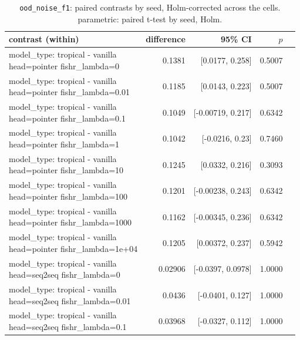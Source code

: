 \documentclass[10pt]{article}
\makeatletter
\newcommand{\stackcell}[1]{\begin{tabular}[t]{@{}l@{}}#1\end{tabular}}
\makeatother
\begin{document}
{\small
\begin{longtable}{lrrrl}
\caption{\texttt{ood\_noise\_f1}: paired contrasts by seed, Holm-corrected across the cells. parametric: paired t-test by seed, Holm.}\label{tab:paired-ood_noise_f1}\\
\toprule
contrast (within) & difference & 95\% CI & $p$ & \\
\midrule
\endhead
\stackcell{model\_type: tropical - vanilla\\\footnotesize head=pointer fishr\_lambda=0 } & 0.1381 & [0.0177, 0.258] & 0.5007 & \\
\stackcell{model\_type: tropical - vanilla\\\footnotesize head=pointer fishr\_lambda=0.01 } & 0.1185 & [0.0143, 0.223] & 0.5007 & \\
\stackcell{model\_type: tropical - vanilla\\\footnotesize head=pointer fishr\_lambda=0.1 } & 0.1049 & [-0.00719, 0.217] & 0.6342 & \\
\stackcell{model\_type: tropical - vanilla\\\footnotesize head=pointer fishr\_lambda=1 } & 0.1042 & [-0.0216, 0.23] & 0.7460 & \\
\stackcell{model\_type: tropical - vanilla\\\footnotesize head=pointer fishr\_lambda=10 } & 0.1245 & [0.0332, 0.216] & 0.3093 & \\
\stackcell{model\_type: tropical - vanilla\\\footnotesize head=pointer fishr\_lambda=100 } & 0.1201 & [-0.00238, 0.243] & 0.6342 & \\
\stackcell{model\_type: tropical - vanilla\\\footnotesize head=pointer fishr\_lambda=1000 } & 0.1162 & [-0.00345, 0.236] & 0.6342 & \\
\stackcell{model\_type: tropical - vanilla\\\footnotesize head=pointer fishr\_lambda=1e+04 } & 0.1205 & [0.00372, 0.237] & 0.5942 & \\
\stackcell{model\_type: tropical - vanilla\\\footnotesize head=seq2seq fishr\_lambda=0 } & 0.02906 & [-0.0397, 0.0978] & 1.0000 & \\
\stackcell{model\_type: tropical - vanilla\\\footnotesize head=seq2seq fishr\_lambda=0.01 } & 0.0436 & [-0.0401, 0.127] & 1.0000 & \\
\stackcell{model\_type: tropical - vanilla\\\footnotesize head=seq2seq fishr\_lambda=0.1 } & 0.03968 & [-0.0327, 0.112] & 1.0000 & \\

\end{longtable}}
\end{document}
